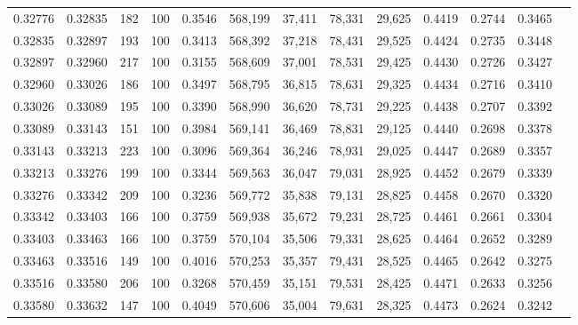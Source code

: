 \begin{tabular}{rrrrrrrrrrrrr}
0.32776 & 0.32835 &   182 & 100 &                                     0.3546 & 568,199 &  37,411 &  78,331 &  29,625 & 0.4419 & 0.2744 & 0.3465 \\
0.32835 & 0.32897 &   193 & 100 &                                     0.3413 & 568,392 &  37,218 &  78,431 &  29,525 & 0.4424 & 0.2735 & 0.3448 \\
0.32897 & 0.32960 &   217 & 100 &                                     0.3155 & 568,609 &  37,001 &  78,531 &  29,425 & 0.4430 & 0.2726 & 0.3427 \\
0.32960 & 0.33026 &   186 & 100 &                                     0.3497 & 568,795 &  36,815 &  78,631 &  29,325 & 0.4434 & 0.2716 & 0.3410 \\
0.33026 & 0.33089 &   195 & 100 &                                     0.3390 & 568,990 &  36,620 &  78,731 &  29,225 & 0.4438 & 0.2707 & 0.3392 \\
0.33089 & 0.33143 &   151 & 100 &                                     0.3984 & 569,141 &  36,469 &  78,831 &  29,125 & 0.4440 & 0.2698 & 0.3378 \\
0.33143 & 0.33213 &   223 & 100 &                                     0.3096 & 569,364 &  36,246 &  78,931 &  29,025 & 0.4447 & 0.2689 & 0.3357 \\
0.33213 & 0.33276 &   199 & 100 &                                     0.3344 & 569,563 &  36,047 &  79,031 &  28,925 & 0.4452 & 0.2679 & 0.3339 \\
0.33276 & 0.33342 &   209 & 100 &                                     0.3236 & 569,772 &  35,838 &  79,131 &  28,825 & 0.4458 & 0.2670 & 0.3320 \\
0.33342 & 0.33403 &   166 & 100 &                                     0.3759 & 569,938 &  35,672 &  79,231 &  28,725 & 0.4461 & 0.2661 & 0.3304 \\
0.33403 & 0.33463 &   166 & 100 &                                     0.3759 & 570,104 &  35,506 &  79,331 &  28,625 & 0.4464 & 0.2652 & 0.3289 \\
0.33463 & 0.33516 &   149 & 100 &                                     0.4016 & 570,253 &  35,357 &  79,431 &  28,525 & 0.4465 & 0.2642 & 0.3275 \\
0.33516 & 0.33580 &   206 & 100 &                                     0.3268 & 570,459 &  35,151 &  79,531 &  28,425 & 0.4471 & 0.2633 & 0.3256 \\
0.33580 & 0.33632 &   147 & 100 &                                     0.4049 & 570,606 &  35,004 &  79,631 &  28,325 & 0.4473 & 0.2624 & 0.3242 \\

\end{tabular}
